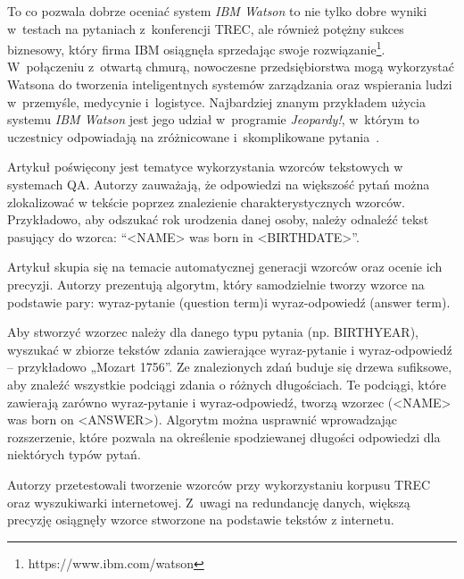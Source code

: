 To co pozwala dobrze oceniać system \emph{IBM Watson} to nie tylko dobre wyniki w~testach na pytaniach z~konferencji TREC, ale również potężny sukces biznesowy, który firma IBM osiągnęła sprzedając swoje rozwiązanie\footnote{https://www.ibm.com/watson}. W~połączeniu z~otwartą chmurą, nowoczesne przedsiębiorstwa mogą wykorzystać Watsona do tworzenia inteligentnych systemów zarządzania oraz wspierania ludzi w~przemyśle, medycynie i~logistyce. Najbardziej znanym przykładem użycia systemu \emph{IBM Watson} jest jego udział w~programie \emph{Jeopardy!}, w~którym to uczestnicy odpowiadają na zróżnicowane i~skomplikowane pytania~\cite{lapshin2012question}. 

Artykuł \cite{ravichandran-hovy-2002-learning} poświęcony jest tematyce wykorzystania wzorców tekstowych w systemach QA. Autorzy zauważają, że odpowiedzi na większość pytań można zlokalizować w tekście poprzez znalezienie charakterystycznych wzorców. Przykładowo, aby odszukać rok urodzenia danej osoby, należy odnaleźć tekst pasujący do wzorca: “<NAME> was born in <BIRTHDATE>”.

Artykuł skupia się na temacie automatycznej generacji wzorców oraz ocenie ich precyzji. Autorzy prezentują algorytm, który samodzielnie tworzy wzorce na podstawie pary: wyraz-pytanie (question term)i wyraz-odpowiedź (answer term). 

Aby stworzyć wzorzec należy dla danego typu pytania (np. BIRTHYEAR), wyszukać w zbiorze tekstów zdania zawierające wyraz-pytanie i wyraz-odpowiedź  – przykładowo „Mozart 1756”. Ze znalezionych zdań buduje się drzewa sufiksowe, aby znaleźć wszystkie podciągi zdania o różnych długościach. Te podciągi, które zawierają zarówno wyraz-pytanie i wyraz-odpowiedź, tworzą wzorzec (<NAME> was born on <ANSWER>). Algorytm można usprawnić wprowadzając rozszerzenie, które pozwala na określenie spodziewanej długości odpowiedzi dla niektórych typów pytań. 

Autorzy przetestowali tworzenie wzorców przy wykorzystaniu korpusu TREC oraz wyszukiwarki internetowej. Z~uwagi na redundancję danych, większą precyzję osiągnęły wzorce stworzone na podstawie tekstów z internetu. 

